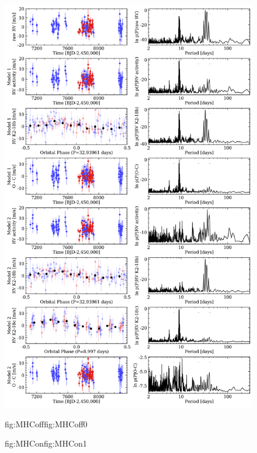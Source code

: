 \begin{figure} %
  \centering
  \includegraphics[width=0.8\hsize]{figures/analysisHC161_bkgd.png}%
  \hspace{-0.8\hsize}%
  \begin{ocg}{fig:MHCoff}{fig:MHCoff}{0}%
  \end{ocg}%
  \begin{ocg}{fig:MHCon}{fig:MHCon}{1}%

\end{ocg}
\end{figure}
